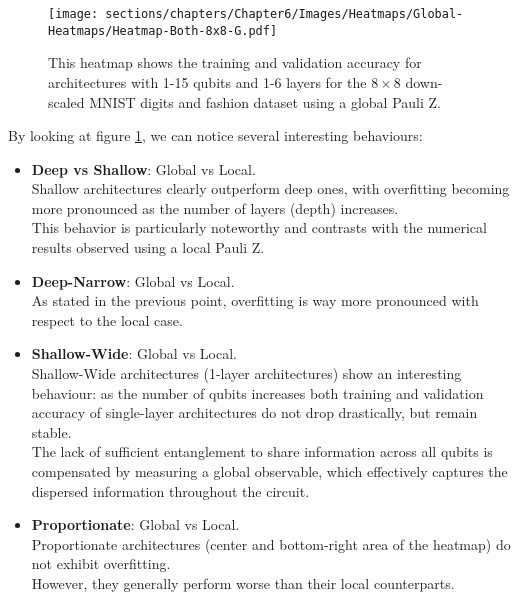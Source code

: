 
\begin{figure}[h]
    \centering
    \texttt{[image: sections/chapters/Chapter6/Images/Heatmaps/Global-Heatmaps/Heatmap-Both-8x8-G.pdf]}
    \caption{This heatmap shows the training and validation accuracy for architectures with 1-15 qubits and
    1-6 layers for the $8\times8$ down-scaled MNIST digits and fashion dataset using a global Pauli Z.}
    \label{fig:heatmap-8x8-G}
\end{figure}


By looking at figure \ref{fig:heatmap-8x8-G}, we can notice 
several interesting behaviours:

\begin{itemize}
    \item \textbf{Deep vs Shallow}: Global vs Local.\\
    Shallow architectures clearly outperform deep ones, with overfitting becoming more pronounced 
    as the number of layers (depth) increases.\\
    This behavior is particularly noteworthy and contrasts with the numerical results observed 
    using a local Pauli Z.
    \item \textbf{Deep-Narrow}: Global vs Local.\\
    As stated in the previous point, overfitting is way more pronounced with respect to the local case.\\
    \item \textbf{Shallow-Wide}: Global vs Local.\\
    Shallow-Wide architectures (1-layer architectures) show an interesting behaviour: as the number of 
    qubits increases both training and validation accuracy of single-layer architectures 
    do not drop drastically, but remain stable.\\
    The lack of sufficient entanglement to share information across all qubits is compensated by 
    measuring a global observable, which effectively captures the dispersed information throughout the 
    circuit.
    \item \textbf{Proportionate}: Global vs Local.\\
    Proportionate architectures (center and bottom-right area of the heatmap) do not exhibit overfitting. \\
    However, they generally perform worse than their local counterparts.
 \end{itemize}
